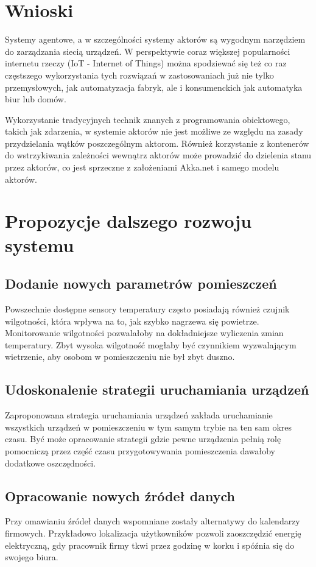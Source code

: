 \section{Wnioski}
Systemy agentowe, a w szczególności systemy aktorów są wygodnym narzędziem do zarządzania siecią urządzeń. 
W perspektywie coraz większej popularności internetu rzeczy (IoT - Internet of Things) można spodziewać się też co raz częstszego wykorzystania tych rozwiązań w zastosowaniach już nie tylko przemysłowych, jak automatyzacja fabryk, ale i konsumenckich jak automatyka biur lub domów.  

Wykorzystanie tradycyjnych technik znanych z programowania obiektowego, takich jak zdarzenia, w systemie aktorów nie jest możliwe ze względu na zasady przydzielania wątków poszczególnym aktorom. Również 
korzystanie z kontenerów do wstrzykiwania zależności wewnątrz aktorów może prowadzić do dzielenia stanu przez aktorów, co jest sprzeczne z założeniami Akka.net i samego modelu aktorów.

\section{Propozycje dalszego rozwoju systemu}
\subsection*{Dodanie nowych parametrów pomieszczeń}
Powszechnie dostępne sensory temperatury często posiadają również czujnik wilgotności, która wpływa na to, jak szybko nagrzewa się powietrze. Monitorowanie wilgotności pozwalałoby na dokładniejsze wyliczenia zmian temperatury. Zbyt wysoka wilgotność mogłaby być czynnikiem wyzwalającym wietrzenie, aby osobom w pomieszczeniu nie był zbyt duszno.

\subsection*{Udoskonalenie strategii uruchamiania urządzeń}
Zaproponowana strategia uruchamiania urządzeń zakłada uruchamianie wszystkich urządzeń w pomieszczeniu w tym samym trybie na ten sam okres czasu. Być może opracowanie strategii gdzie pewne urządzenia pełnią rolę pomocniczą przez część czasu przygotowywania pomieszczenia dawałoby dodatkowe oszczędności.

\subsection*{Opracowanie nowych źródeł danych}
Przy omawianiu źródeł danych wspomniane zostały alternatywy do kalendarzy firmowych. Przykładowo lokalizacja użytkowników pozwoli zaoszczędzić energię elektryczną, gdy pracownik firmy tkwi przez godzinę w korku i spóźnia się do swojego biura. 

